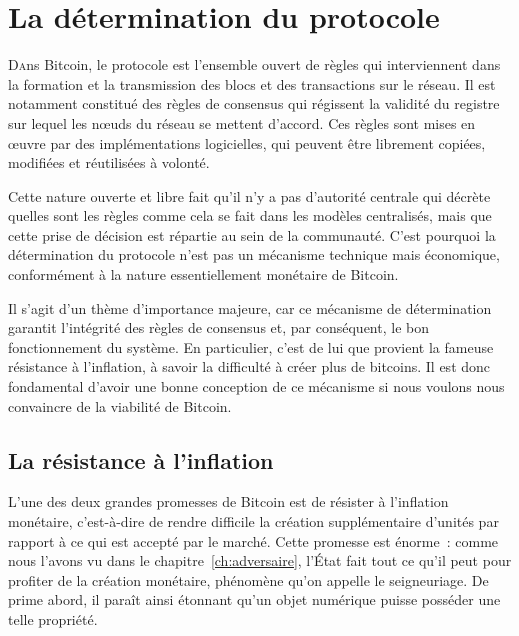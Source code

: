 
\chapter{La détermination du protocole}
\label{ch:determination}
\label{enotezch:11}

\lettrine[]{D}ans Bitcoin, le protocole est l'ensemble ouvert de règles qui interviennent dans la formation et la transmission des blocs et des transactions sur le réseau. Il est notamment constitué des règles de consensus qui régissent la validité du registre sur lequel les nœuds du réseau se mettent d'accord. Ces règles sont mises en œuvre par des implémentations logicielles, qui peuvent être librement copiées, modifiées et réutilisées à volonté.

Cette nature ouverte et libre fait qu'il n'y a pas d'autorité centrale qui décrète quelles sont les règles comme cela se fait dans les modèles centralisés, mais que cette prise de décision est répartie au sein de la communauté. C'est pourquoi la détermination du protocole n'est pas un mécanisme technique mais économique, conformément à la nature essentiellement monétaire de Bitcoin.

Il s'agit d'un thème d'importance majeure, car ce mécanisme de détermination garantit l'intégrité des règles de consensus et, par conséquent, le bon fonctionnement du système. En particulier, c'est de lui que provient la fameuse résistance à l'inflation, à savoir la difficulté à créer plus de bitcoins. Il est donc fondamental d'avoir une bonne conception de ce mécanisme si nous voulons nous convaincre de la viabilité de Bitcoin.

%

\section*{La résistance à l'inflation}

L'une des deux grandes promesses de Bitcoin est de résister à l'inflation monétaire, c'est-à-dire de rendre difficile la création supplémentaire d'unités par rapport à ce qui est accepté par le marché. Cette promesse est énorme~: comme nous l'avons vu dans le chapitre~\ref{ch:adversaire}, l'État fait tout ce qu'il peut pour profiter de la création monétaire, phénomène qu'on appelle le seigneuriage. De prime abord, il paraît ainsi étonnant qu'un objet numérique puisse posséder une telle propriété.

